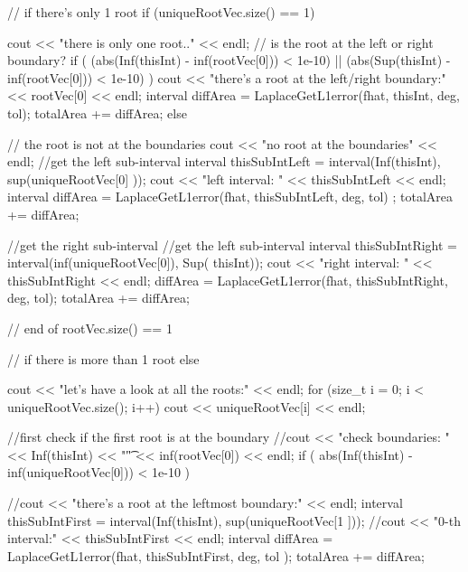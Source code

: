 \begin{DoxyCode}
{{{      // if there's only 1 root
      if (uniqueRootVec.size() == 1) {
        cout << "there is only one root.." << endl;
        // is the root at the left or right boundary?
        if ( (abs(Inf(thisInt) - inf(rootVec[0])) < 1e-10) || 
            (abs(Sup(thisInt) - inf(rootVec[0])) < 1e-10) ) {
        cout << "there's a root at the left/right boundary:" << rootVec[0] << 
      endl;
          interval diffArea = LaplaceGetL1error(fhat, thisInt, deg, tol);
          totalArea += diffArea;
        }
        else { // the root is not at the boundaries
          cout << "no root at the boundaries" << endl;
          //get the left sub-interval
          interval thisSubIntLeft = interval(Inf(thisInt), sup(uniqueRootVec[0]
      ));
          cout << "left interval: " << thisSubIntLeft << endl; 
          interval diffArea = LaplaceGetL1error(fhat, thisSubIntLeft, deg, tol)
      ;
          totalArea += diffArea;
          
          //get the right sub-interval
          //get the left sub-interval
          interval thisSubIntRight = interval(inf(uniqueRootVec[0]), Sup(
      thisInt));
          cout << "right interval: " << thisSubIntRight << endl; 
          diffArea = LaplaceGetL1error(fhat, thisSubIntRight, deg, tol);
          totalArea += diffArea;
        }
      } // end of rootVec.size() == 1

        // if there is more than 1 root
      else {
        cout << "let's have a look at all the roots:" << endl;
        for (size_t i = 0; i < uniqueRootVec.size(); i++) {
          cout << uniqueRootVec[i] << endl;
        }

        //first check if the first root is at the boundary
        //cout << "check boundaries: " << Inf(thisInt) << "\t" <<
       inf(rootVec[0]) << endl;
        if ( abs(Inf(thisInt) - inf(uniqueRootVec[0])) < 1e-10 ) {
          //cout << "there's a root at the leftmost boundary:" << endl;
          interval thisSubIntFirst = interval(Inf(thisInt), sup(uniqueRootVec[1
      ]));
          //cout << "0-th interval:" << thisSubIntFirst << endl; 
          interval diffArea = LaplaceGetL1error(fhat, thisSubIntFirst, deg, tol
      );
          totalArea += diffArea;
          
}}}}}
\end{DoxyCode}
